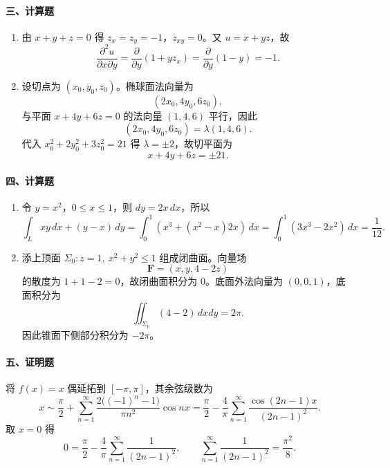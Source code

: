 \paragraph{三、计算题}

\begin{enumerate}
  \item 由 $x+y+z=0$ 得 $z_x=z_y=-1$，$z_{xy}=0$。又 $u=x+yz$，故
  \[
    \frac{\partial^2u}{\partial x\partial y}
    =
    \frac{\partial}{\partial y}\left(1+yz_x\right)
    =
    \frac{\partial}{\partial y}(1-y)=-1.
  \]

  \item 设切点为 $(x_0,y_0,z_0)$。椭球面法向量为
  \[
    (2x_0,4y_0,6z_0),
  \]
  与平面 $x+4y+6z=0$ 的法向量 $(1,4,6)$ 平行，因此
  \[
    (2x_0,4y_0,6z_0)=\lambda(1,4,6).
  \]
  代入 $x_0^2+2y_0^2+3z_0^2=21$ 得 $\lambda=\pm2$，故切平面为
  \[
    x+4y+6z=\pm 21.
  \]
\end{enumerate}

\paragraph{四、计算题}

\begin{enumerate}
  \item 令 $y=x^2$，$0\le x\le 1$，则 $dy=2x\,dx$，所以
  \[
    \int_L xy\,dx+(y-x)\,dy
    =
    \int_0^1\left(x^3+(x^2-x)2x\right)\,dx
    =
    \int_0^1(3x^3-2x^2)\,dx
    =
    \frac1{12}.
  \]

  \item 添上顶面 $\Sigma_0:z=1,\ x^2+y^2\le1$ 组成闭曲面。向量场
  \[
    \mathbf F=(x,y,4-2z)
  \]
  的散度为 $1+1-2=0$，故闭曲面积分为 $0$。底面外法向量为 $(0,0,1)$，底面积分为
  \[
    \iint_{\Sigma_0}(4-2)\,dxdy=2\pi.
  \]
  因此锥面下侧部分积分为 $-2\pi$。
\end{enumerate}

\paragraph{五、证明题}

将 $f(x)=x$ 偶延拓到 $[-\pi,\pi]$，其余弦级数为
\[
  x\sim \frac{\pi}{2}
  +\sum_{n=1}^{\infty}\frac{2\big((-1)^n-1\big)}{\pi n^2}\cos nx
  =
  \frac{\pi}{2}
  -\frac{4}{\pi}\sum_{n=1}^{\infty}\frac{\cos(2n-1)x}{(2n-1)^2}.
\]
取 $x=0$ 得
\[
  0=\frac{\pi}{2}
  -\frac{4}{\pi}\sum_{n=1}^{\infty}\frac1{(2n-1)^2},
  \qquad
  \sum_{n=1}^{\infty}\frac1{(2n-1)^2}=\frac{\pi^2}{8}.
\]

